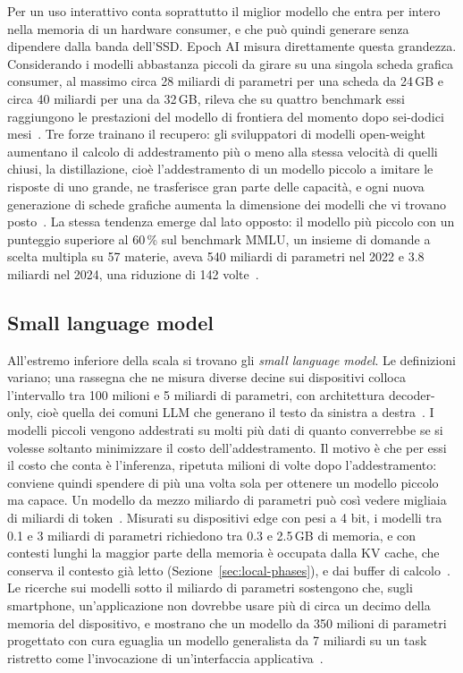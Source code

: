 Per un uso interattivo conta soprattutto il miglior modello che entra per intero nella memoria di un hardware
consumer, e che può quindi generare senza dipendere dalla banda dell'SSD. Epoch AI misura direttamente questa grandezza. Considerando i modelli
abbastanza piccoli da girare su una singola scheda grafica consumer, al massimo circa 28 miliardi di parametri per una
scheda da 24\,GB e circa 40 miliardi per una da 32\,GB, rileva che su quattro benchmark essi raggiungono le prestazioni
del modello di frontiera del momento dopo sei-dodici mesi~\cite{epoch2025consumergpu}. Tre forze trainano il recupero:
gli sviluppatori di modelli open-weight aumentano il calcolo di addestramento più o meno alla stessa velocità di quelli
chiusi, la distillazione, cioè l'addestramento di un modello piccolo a imitare le risposte di uno grande, ne trasferisce gran
parte delle capacità, e ogni nuova
generazione di schede grafiche aumenta la dimensione dei modelli che vi trovano posto~\cite{epoch2025bestmodel}. La
stessa tendenza emerge dal lato opposto: il modello più piccolo con un punteggio superiore al 60\,\% sul benchmark MMLU, un
insieme di domande a scelta multipla su 57 materie, aveva 540 miliardi di parametri nel 2022 e 3.8 miliardi nel 2024, una riduzione di 142 volte~\cite{stanford2025aiindex}.

\subsection{Small language model}
\label{sec:local-slm}

All'estremo inferiore della scala si trovano gli \emph{small language model}. Le definizioni variano; una rassegna che ne
misura diverse decine sui dispositivi colloca l'intervallo tra 100 milioni e 5 miliardi di parametri, con architettura
decoder-only, cioè quella dei comuni LLM che generano il testo da sinistra a destra~\cite{lu2024slm}. I modelli piccoli
vengono addestrati su molti più dati di quanto converrebbe se si volesse soltanto minimizzare il costo
dell'addestramento. Il motivo è che per essi il costo che conta è l'inferenza, ripetuta milioni di volte dopo
l'addestramento: conviene quindi spendere di più una volta sola per ottenere un modello piccolo ma capace. Un modello da
mezzo miliardo di parametri può così vedere migliaia di miliardi di token~\cite{lu2024slm}. Misurati su dispositivi edge con pesi a 4 bit, i modelli tra 0.1 e 3 miliardi di parametri
richiedono tra 0.3 e 2.5\,GB di memoria, e con contesti lunghi la maggior parte della memoria è occupata dalla KV cache, che conserva il contesto già letto
(Sezione~\ref{sec:local-phases}), e dai buffer di calcolo~\cite{lu2024slm}. Le ricerche sui modelli sotto il miliardo di parametri sostengono che, sugli smartphone,
un'applicazione non dovrebbe usare più di circa un decimo della memoria del dispositivo, e mostrano che un modello da 350
milioni di parametri progettato con cura eguaglia un modello generalista da 7 miliardi su un task ristretto come
l'invocazione di un'interfaccia applicativa~\cite{liu2024mobilellm}.

